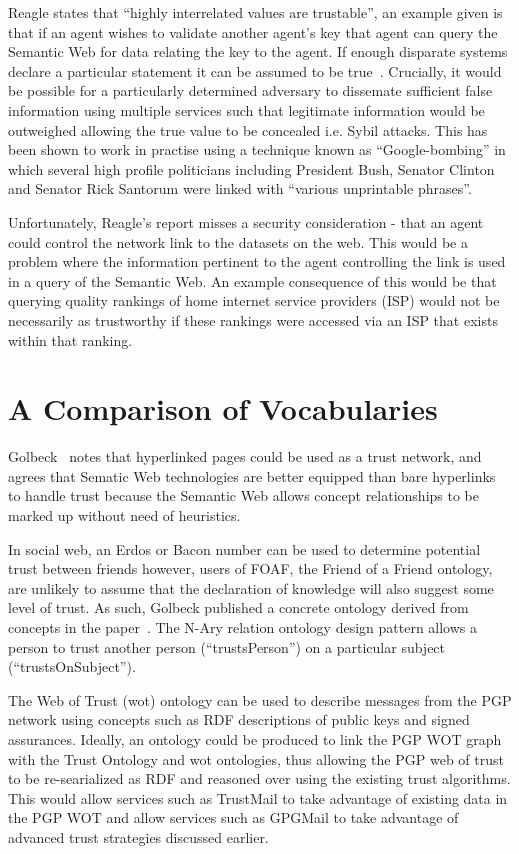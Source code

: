 \documentclass{acm_proc_article-sp}
\begin{document}
Reagle states that ``highly interrelated values are trustable'', an example given is that if an agent wishes to validate another agent's key that agent can query the Semantic Web for data relating the key to the agent.  If enough disparate systems declare a particular statement it can be assumed to be true~\cite{reagle_key_2002}. Crucially, it would be possible for a particularly determined adversary to dissemate sufficient false information using multiple services such that legitimate information would be outweighed allowing the true value to be concealed i.e. Sybil\cite{douceur_sybil_2002} attacks.  This has been shown to work in practise using a technique known as ``Google-bombing'' in which several high profile politicians including President Bush, Senator Clinton and Senator Rick Santorum were linked with ``various unprintable phrases''\cite{yourmessagehere}.

Unfortunately, Reagle's report misses a security consideration - that an agent could control the network link to the datasets on the web. This would be a problem where the information pertinent to the agent controlling the link is used in a query of the Semantic Web.   An example consequence of this would be that querying quality rankings of home internet service providers (ISP) would not be necessarily as trustworthy if these rankings were accessed via an ISP that exists within that ranking.

\section{A Comparison of Vocabularies}
Golbeck~\cite{golbeck} notes that hyperlinked pages could be used as a trust network, and agrees that Sematic Web technologies are better equipped than bare hyperlinks to handle trust because the Semantic Web allows concept relationships to be marked up without need of heuristics.

In social web, an Erdos or Bacon number\cite{Bacon} can be used to determine potential trust between friends however, users of FOAF, the Friend of a Friend ontology\cite{FOAF}, are unlikely to assume that the declaration of knowledge will also suggest some level of trust. As such, Golbeck published a concrete ontology derived from concepts in the paper~\cite{jennifer_golbeck_trust_2013}. The N-Ary relation ontology design pattern allows a person to trust another person (``trustsPerson'') on a particular subject (``trustsOnSubject'').

The Web of Trust (wot) ontology can be used to describe messages from the PGP network\cite{_web_2004} using concepts such as RDF descriptions of public keys and signed assurances.  Ideally, an ontology could be produced to link the PGP WOT graph with the Trust Ontology and wot ontologies, thus allowing the PGP web of trust to be re-searialized as RDF and reasoned over using the existing trust algorithms. This would allow services such as TrustMail to take advantage of existing data in the PGP WOT and allow services such as GPGMail to take advantage of advanced trust strategies discussed earlier.
\end{document}
